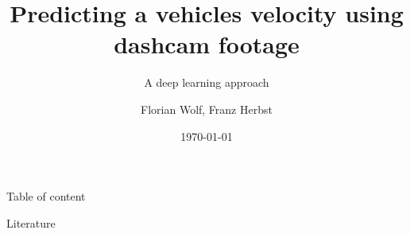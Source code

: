 \documentclass[handout, 10pt, aspectratio=43]{beamer}
\title{Predicting a vehicles velocity using dashcam footage} %
\subtitle{A deep learning approach}
\author{Florian Wolf, Franz Herbst}
\institute[Universität Konstanz]{
    Machine Learning using Matlab \\
    Universität Konstanz
} %
\date{\today}
\begin{document}
    \RaggedRight
    \frame{\titlepage}
    
    \begin{frame}{Table of content}
        \tableofcontents
    \end{frame}
    
    
    
    
    
	
    \begin{frame}[allowframebreaks]{Literature}
    	\nocite{*}
        \printbibliography
     \end{frame}
\end{document}
